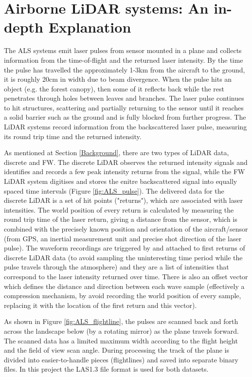 \documentclass{subfiles}
\begin{document}
    \section{Airborne LiDAR systems: An in-depth Explanation}\label{sec:ALS}
     
        
    
    The ALS systems emit laser pulses from sensor mounted in a plane and collects information from the time-of-flight and the returned laser intensity.  By the time the pulse has travelled the approximately 1-3km from the aircraft to the ground, it is roughly 20cm in width due to beam divergence.  When the pulse hits an object (e.g. the forest canopy), then some of it reflects back while the rest penetrates through holes between leaves and branches. The laser pulse continues to hit structures, scattering and partially returning to the sensor until it reaches a solid barrier such as the ground and is fully blocked from further progress.  The LiDAR systems record information from the backscattered laser pulse, measuring its round trip time and the returned intensity.
     
     As mentioned at Section \ref{Background}, there are two types of LiDAR data,  discrete and FW. The discrete LiDAR observes the returned intensity signals and identifies and {\color{blue} records a few peak intensity returns from the signal}, while the FW LiDAR system digitises and stores the enitre backscattered signal into equally spaced time intervals (Figure \ref{fig:ALS_pulse}). The delivered data for the discrete LiDAR is a set of hit points ("returns"), which are associated with laser intensities. The world position of every return is calculated by measuring the round trip time of the laser return, giving a distance from the sensor, which is combined with the precisely known position and orientation of the aircraft/sensor (from GPS, an inertial measurement unit and precise shot direction of the laser pulse). The waveform recordings are triggered by and attached to first returns of discrete LiDAR data (to avoid sampling the uninteresting time period while the pulse travels through the atmosphere) and they are a list of intensities that correspond to the laser intensity returned over time. There is also an offset vector which defines the distance and direction between each wave sample (effectively a compression mechanism, by avoid recording the world position of every sample, replacing it with the location of the first return and this vector).
     
	As shown in Figure \ref{fig:ALS_flightline}, the pulses are scanned back and forth across the landscape below (by a rotating mirror) as the plane travels forward.  The scanned data has a limited maximum width according to the flight height and the field of view scan angle. During processing the track of the plane is divided into easier-to-handle pieces (flightlines) and saved into separate binary files. In this project the LAS1.3 file format is used for both datasets. 
      
\end{document}
